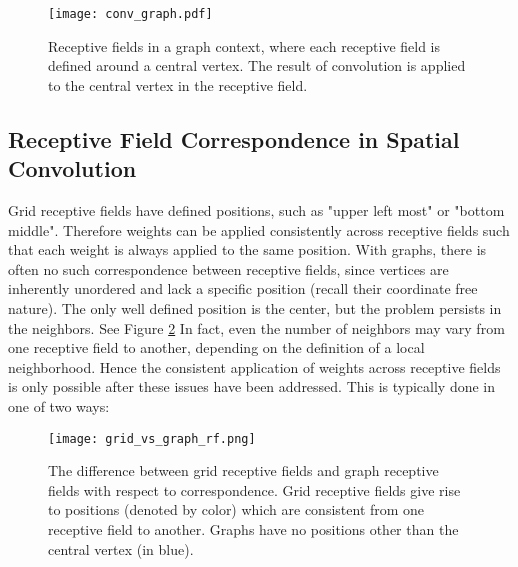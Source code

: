 \begin{figure}
	\centering
	\texttt{[image: conv\_graph.pdf]}
	\caption{Receptive fields in a graph context, where each receptive field is defined around a central vertex. The result of convolution is applied to the central vertex in the receptive field.}
	\label{fig:spatial_graph_conv}
\end{figure}

\subsection{Receptive Field Correspondence in Spatial Convolution}


Grid receptive fields have defined positions, such as "upper left most" or "bottom middle".
Therefore weights can be applied consistently across receptive fields such that each weight is always applied to the same position.
With graphs, there is often no such correspondence between receptive fields, since vertices are inherently unordered and lack a specific position (recall their coordinate free nature).
The only well defined position is the center, but the problem persists in the neighbors.
See Figure \ref{fig:grid_vs_graph_rf}
In fact, even the number of neighbors may vary from one receptive field to another, depending on the definition of a local neighborhood.
Hence the consistent application of weights across receptive fields is only possible after these issues have been addressed.
This is typically done in one of two ways:

\begin{figure}
\texttt{[image: grid\_vs\_graph\_rf.png]}
\caption{The difference between grid receptive fields and graph receptive fields with respect to correspondence. Grid receptive fields give rise to positions (denoted by color) which are consistent from one receptive field to another. Graphs have no positions other than the central vertex (in blue).}
\label{fig:grid_vs_graph_rf}
\end{figure}


